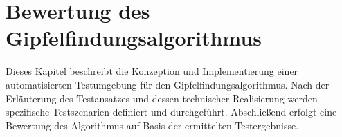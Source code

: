 \chapter{Bewertung des Gipfelfindungsalgorithmus}\label{chap:bewertung_gipfelfindungsalgorithmus} 
Dieses Kapitel beschreibt die Konzeption und Implementierung einer automatisierten Testumgebung für den Gipfelfindungsalgorithmus. Nach der Erläuterung des Testansatzes und dessen technischer Realisierung werden spezifische Testszenarien definiert und durchgeführt. Abschließend erfolgt eine Bewertung des Algorithmus auf Basis der ermittelten Testergebnisse. 
